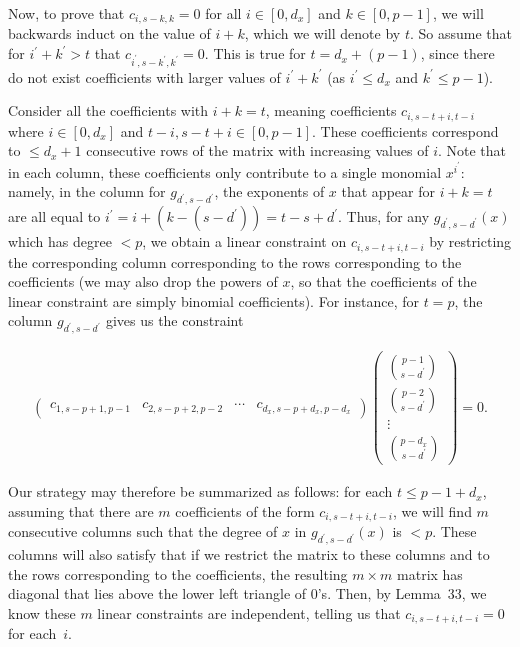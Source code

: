Now, to prove that $c_{i,s-k,k}=0$ for all $i\in[0,d_{x}]$ and $k\in[0,p-1]$, we will backwards induct on the value of $i+k$, which we will denote by $t$. So assume that for $i^{\prime}+k^{\prime}>t$ that $c_{i^{\prime},s-k^{\prime},k^{\prime}}=0$. This is true for $t=d_{x}+(p-1)$, since there do not exist coefficients with larger values of $i^{\prime}+k^{\prime}$ (as $i^{\prime}\leq d_{x}$ and $k^{\prime}\leq p-1$).\par




Consider all the coefficients with $i+k=t$, meaning coefficients $c_{i,s-t+i,t-i}$ where $i\in[0,d_{x}]$ and $t-i,s-t+i\in[0,p-1]$. These coefficients correspond to $\leq d_{x}+1$ consecutive rows of the matrix with increasing values of $i$. Note that in each column, these coefficients only contribute to a single monomial $x^{i^{\prime}}$: namely, in the column for $g_{d^{\prime},s-d^{\prime}}$, the exponents of $x$ that appear for $i+k=t$ are all equal to $i^{\prime}=i+(k-(s-d^{\prime}))=t-s+d^{\prime}$. Thus, for any $g_{d^{\prime},s-d^{\prime}}(x)$ which has degree $<p$, we obtain a linear constraint on $c_{i,s-t+i,t-i}$ by restricting the corresponding column corresponding to the rows corresponding to the coefficients (we may also drop the powers of $x$, so that the coefficients of the linear constraint are simply binomial coefficients). For instance, for $t=p$, the column $g_{d^{\prime},s-d^{\prime}}$ gives us the constraint\par


\[\begin{gathered}
\begin{pmatrix}c_{1,s-p+1,p-1}&c_{2,s-p+2,p-2}&\cdots&c_{d_{x},s-p+d_{x},p-d_{x}}\end{pmatrix}\begin{pmatrix}\binom{p-1}{s-d^{\prime}}\\
\binom{p-2}{s-d^{\prime}}\\
\vdots\\
\binom{p-d_{x}}{s-d^{\prime}}\end{pmatrix}=0.
\end{gathered}\]




Our strategy may therefore be summarized as follows: for each $t\leq p-1+d_{x}$, assuming that there are $m$ coefficients of the form $c_{i,s-t+i,t-i}$, we will find $m$ consecutive columns such that the degree of $x$ in $g_{d^{\prime},s-d^{\prime}}(x)$ is $<p$. These columns will also satisfy that if we restrict the matrix to these columns and to the rows corresponding to the coefficients, the resulting $m\times m$ matrix has diagonal that lies above the lower left triangle of $0$’s. Then, by Lemma 33, we know these $m$ linear constraints are independent, telling us that $c_{i,s-t+i,t-i}=0$ for each $i$.\par





